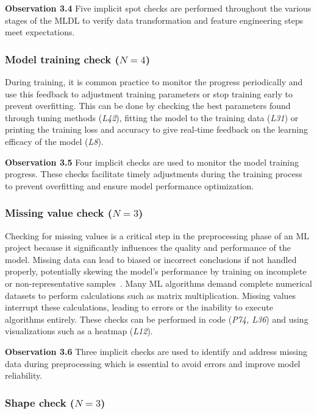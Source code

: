 \documentclass[journal]{IEEEtran}       %
\newcommand{\highlight}[1]{
  \begin{framed}%
    \noindent#1
\end{framed}}
\begin{document}
\highlight{\textbf{Observation 3.4} Five implicit spot checks are
  performed throughout the various stages of the MLDL to verify data
transformation and feature engineering steps meet expectations.}

\subsubsection{Model training check ($N = 4$)}

During training, it is common practice to monitor the progress
periodically and use this feedback to adjustment training parameters
or stop training early to prevent overfitting. This can be done by
checking the best parameters found through tuning methods
(\emph{L42}), fitting the model to the training data (\emph{L31}) or
printing the training loss and accuracy to give real-time feedback on
the learning efficacy of the model (\emph{L8}).

\highlight{\textbf{Observation 3.5} Four implicit checks are used to
  monitor the model training progress. These checks facilitate timely
  adjustments during the training process to prevent overfitting and
ensure model performance optimization.}

\subsubsection{Missing value check ($N = 3$)}

Checking for missing values is a critical step in the preprocessing
phase of an ML project because it significantly influences the
quality and performance of the model. Missing data can lead to biased
or incorrect conclusions if not handled properly, potentially skewing
the model's performance by training on incomplete or
non-representative samples~\cite{shome2022data}. Many ML algorithms
demand complete numerical datasets to perform calculations such as
matrix multiplication. Missing values interrupt these calculations,
leading to errors or the inability to execute algorithms entirely.
These checks can be performed in code (\emph{P74, L36}) and using
visualizations such as a heatmap (\emph{L12}).

\highlight{\textbf{Observation 3.6} Three implicit checks are used to
  identify and address missing data during preprocessing which is
essential to avoid errors and improve model reliability.}

\subsubsection{Shape check ($N = 3$)}
\end{document}
